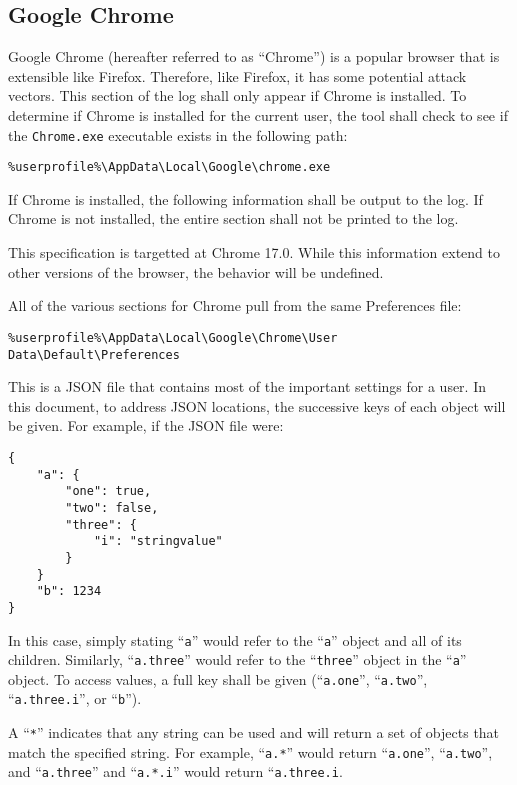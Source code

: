 \subsection{Google Chrome}
Google Chrome (hereafter referred to as ``Chrome'') is a popular browser that is
extensible like Firefox.  Therefore, like Firefox, it has some potential attack
vectors.  This section of the log shall only appear if Chrome is installed.  To
determine if Chrome is installed for the current user, the tool shall check to
see if the \texttt{Chrome.exe} executable exists in the following path:
\begin{verbatim}
%userprofile%\AppData\Local\Google\chrome.exe
\end{verbatim}

If Chrome is installed, the following information shall be output to the log. 
If Chrome is not installed, the entire section shall not be printed to the log.

This specification is targetted at Chrome 17.0.  While this information extend
to other versions of the browser, the behavior will be undefined.  

All of the various sections for Chrome pull from the same Preferences file:
\begin{verbatim}
%userprofile%\AppData\Local\Google\Chrome\User Data\Default\Preferences
\end{verbatim}
This is a JSON file that contains most of the important settings for a user.  In
this document, to address JSON locations, the successive keys of each object
will be given.  For example, if the JSON file were:
\begin{verbatim}
{
    "a": {
        "one": true,
        "two": false,
        "three": {
            "i": "stringvalue"
        }
    }
    "b": 1234
}
\end{verbatim}
In this case, simply stating ``\texttt{a}'' would refer to the ``\texttt{a}''
object and all of its children.  Similarly, ``\texttt{a.three}'' would refer to
the ``\texttt{three}'' object in the ``\texttt{a}'' object.  To access values,
a full key shall be given (``\texttt{a.one}'', ``\texttt{a.two}'',
``\texttt{a.three.i}'', or ``\texttt{b}'').  

A ``\texttt{*}'' indicates that any string can be used and will return a set of
objects that match the specified string.  For example, ``\texttt{a.*}'' would
return ``\texttt{a.one}'', ``\texttt{a.two}'', and ``\texttt{a.three}'' and
``\texttt{a.*.i}'' would return ``\texttt{a.three.i}.

